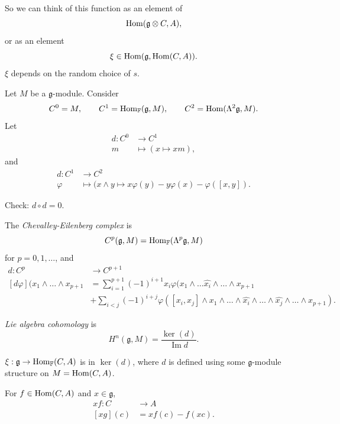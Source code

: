 So we can think of this function as an
element of
$$
\mathop{\mathrm{Hom}}\nolimits(\mathfrak{g} \otimes C,A),
$$
or as an element
$$
\xi \in
\mathop{\mathrm{Hom}}\nolimits(\mathfrak{g},\mathop{\mathrm{Hom}}\nolimits(C,A)).
$$
$\xi$ depends on the random choice of $s$.

\medskip\noindent
Let $M$ be a $\mathfrak{g}$-module.
Consider
$$
\begin{aligned}
C^0 = M, \qquad 
C^1 = \mathop{\mathrm{Hom}}\nolimits_{\mathbb{F}}(\mathfrak{g},M),\qquad 
C^2 = \mathop{\mathrm{Hom}}\nolimits(\Lambda^2\mathfrak{g},M).
\end{aligned}
$$
Let
$$
\begin{aligned}
d: C^0 &\longrightarrow C^1 \\
m &\longmapsto (x \mapsto xm),
\end{aligned}
$$
and
$$
\begin{aligned}
d: C^1 &\longrightarrow C^2 \\
\varphi &\longmapsto 
(x \wedge y \mapsto 
x \varphi(y) - y \varphi(x)-
\varphi([x,y]).
\end{aligned}
$$

Check: $d \circ d =0$.


\begin{definition}
\label{definition-lie-algebra-cohomology}
The {\it Chevalley-Eilenberg complex} is
$$
C^p(\mathfrak{g},M)
=
\mathop{\mathrm{Hom}}\nolimits_{\mathbb{F}}
(\Lambda^p\mathfrak{g},M)
$$
for $p=0,1,\dots$, and
$$
\begin{aligned}
d: C^p &\longrightarrow C^{p+1} \\
[d\varphi](x_1 \wedge\dots\wedge x_{p+1} &=
\sum_{i=1}^{p+1}(-1)^{i+1}
x_i \varphi(x_1 \wedge\dots \widehat{x_i}
\wedge\dots \wedge x_{p+1}
\\ &+ \sum_{i<j}(-1)^{i+j}
\varphi([x_i,x_j]\wedge x_1 \wedge\dots
\wedge \widehat{x_i} \wedge\dots
\wedge \widehat{x_j}\wedge
\dots \wedge x_{p+1}).
\end{aligned}
$$

\noindent
{\it Lie algebra cohomology} is
$$
H^n(\mathfrak{g},M)
=
\frac{\ker(d)}{\operatorname{Im}d}.
$$
\end{definition}

\begin{lemma}
\label{lemma-xi}
$\xi:\mathfrak{g} \to
\mathop{\mathrm{Hom}}\nolimits_{\mathbb{F}}(C,A)$ is in $\ker(d)$,
where $d$ is defined using some
$\mathfrak{g}$-module structure on
$M=\mathop{\mathrm{Hom}}\nolimits(C,A)$.
\end{lemma}

\noindent
For $f \in \mathop{\mathrm{Hom}}\nolimits(C,A)$ and
$x \in \mathfrak{g}$,
$$
\begin{aligned}
xf: C &\longrightarrow A \\
[xg](c) &= xf(c) - f(xc).
\end{aligned}
$$

